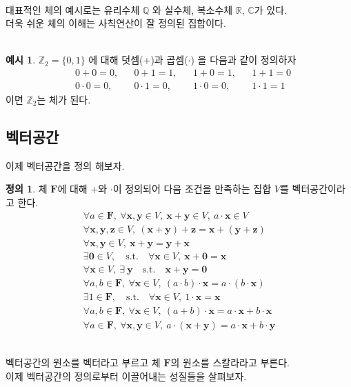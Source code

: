 \documentclass[12pt]{book}
\newcommand{\x}{\mathbf{x}}
\newcommand{\y}{\mathbf{y}}
\newcommand{\z}{\mathbf{z}}
\newcommand{\0}{\mathbf{0}}
\theoremstyle{definition}
\newtheorem{ex}{예시}[section]
\newtheorem*{defi}{정의}
\begin{document}
\ \\대표적인 체의 예시로는 유리수체 $\mathbb{Q}$ 와 실수체, 복소수체 $\mathbb{R}$, $\mathbb{C}$가 있다.\\
더욱 쉬운 체의 이해는 사칙연산이 잘 정의된 집합이다.\\ \\
\begin{ex}
$\mathbb{Z}_2 = \{0,1\}$ 에 대해 덧셈(+)과 곱셈($\cdot$) 을 다음과 같이 정의하자 \\
\begin{align*}
    &0 + 0 = 0,    & &0 + 1 = 1,    & &1 + 0 = 1,    & &1 + 1 = 0 \\
    &0 \cdot 0 = 0, & &0 \cdot 1 = 0, & &1 \cdot 0 = 0, & &1 \cdot 1 = 1
\end{align*}
이면 $\mathbb{Z}_2$는 체가 된다.
\end{ex}
\subsection{벡터공간}
이제 벡터공간을 정의 해보자. \\

\begin{tcolorbox}[title=벡터공간]
    \begin{defi}
        체 $\mathbf{F}$에 대해 +와 $\cdot$이 정의되어 다음 조건을 만족하는 집합 $V$를 벡터공간이라고 한다.
\begin{align*}
    \forall a \in \mathbf{F}, \ \forall \x ,\y \in V,\ \x + \y \in V, \ a \cdot \x \in V \tag{벡터공간 1} \\
    \forall \x ,\y ,\z \in V,\ (\x + \y)+\z =\x +(\y +\z ) \tag{벡터공간 2} \\
    \forall \x ,\y \in V,\ \x +\y =\y +\x \tag{벡터공간 3} \\
    \exists \0 \in V, \quad \text{s.t.} \quad \forall \x \in V, \ \x +\0 =\x \tag{벡터공간 4}\\ 
    \forall \x \in V, \ \exists \ \y \quad \text{s.t.} \quad \x+\y=\0 \tag{벡터공간 5} \\
    \forall a,b \in \mathbf{F},\ \forall \x \in V, \ (a \cdot b) \cdot \x = a \cdot (b \cdot \x) \tag{벡터공간 6} \\
    \exists 1 \in \mathbf{F}, \quad \text{s.t.} \quad \forall \x \in V, \ 1 \cdot \x =\x \tag{벡터공간 7}\\ 
    \forall a,b \in \mathbf{F},\ \forall \x \in V, \ (a + b) \cdot \x = a \cdot \x + b \cdot \x \tag{벡터공간 8} \\
    \forall a \in \mathbf{F},\ \forall \x, \y \in V, \  a \cdot (\x +\y )= a \cdot \x + b \cdot \y \tag{벡터공간 9} 
\end{align*}
\end{defi}
\end{tcolorbox}
\ \\벡터공간의 원소를 벡터라고 부르고 체 $\mathbf{F}$의 원소를 스칼라라고 부른다.\\
이제 벡터공간의 정의로부터 이끌어내는 성질들을 살펴보자.\\
\ \\
\end{document}
